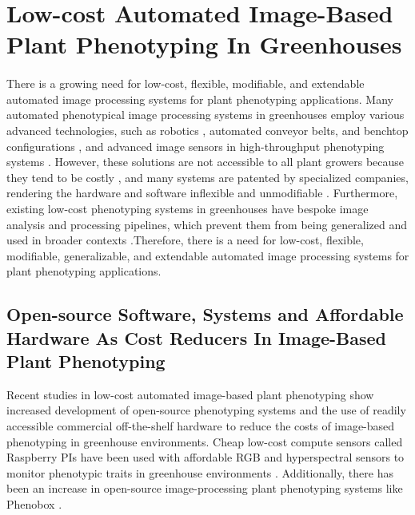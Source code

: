 \section{Low-cost  Automated Image-Based Plant Phenotyping In Greenhouses}
\paragraph{}
There is a growing need for low-cost, flexible, modifiable, and extendable automated image processing systems for plant phenotyping applications. Many automated phenotypical image processing systems in greenhouses employ various advanced technologies, such as robotics \cite{saddikMappingAgriculturalSoil}, automated conveyor belts, and benchtop configurations \cite{bruningDevelopmentHyperspectralDistribution2019, peironeAssessingEfficiencyPhenotyping2018}, and advanced image sensors in high-throughput phenotyping systems \cite{liHighThroughputPlantPhenotyping2021}. However, these solutions are not accessible to all plant growers because they tend to be costly \cite{lienLowcostOpensourcePlatform2019, tovarRaspberryPiPowered2018a, minerviniImageAnalysisNew2015}, and many systems are patented by specialized companies, rendering the hardware and software inflexible and unmodifiable \cite{czedik-eysenbergPhenoBoxFlexibleAutomated2018}. Furthermore, existing low-cost phenotyping systems in greenhouses have bespoke image analysis and processing pipelines, which prevent them from being generalized and used in broader contexts \cite{arnalbarbedoDigitalImageProcessing2013, liReviewImagingTechniques2014} .Therefore, there is a need for low-cost, flexible, modifiable, generalizable, and extendable automated image processing systems for plant phenotyping applications.

\subsection{Open-source Software, Systems and Affordable Hardware As Cost Reducers In Image-Based Plant Phenotyping}
Recent studies in low-cost automated image-based plant phenotyping show increased development of open-source phenotyping systems and the use of readily accessible commercial off-the-shelf hardware \cite{liDigitizationVisualizationGreenhouse2015, minerviniImageAnalysisNew2015} to reduce the costs of image-based phenotyping in greenhouse environments. Cheap low-cost compute sensors called Raspberry PIs have been used with affordable RGB and hyperspectral sensors to monitor phenotypic traits in greenhouse environments \cite{tovarRaspberryPiPowered2018a}. Additionally, there has been  an increase in open-source image-processing plant phenotyping systems like Phenobox \cite{czedik-eysenbergPhenoBoxFlexibleAutomated2018}.

